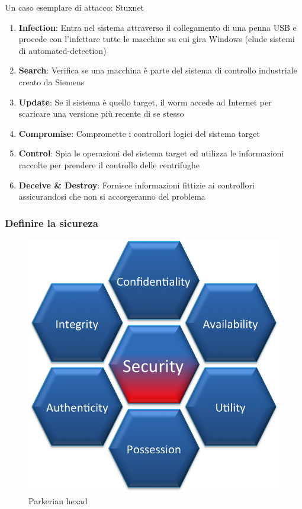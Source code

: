 \begin{frame}{Un caso esemplare di attacco: Stuxnet}
	\begin{enumerate}
		\item \textbf{\color{blue_slides}Infection}: Entra nel sistema attraverso il collegamento di una penna USB e procede con l’infettare tutte le macchine su cui gira Windows (elude sistemi di automated-detection) %
		\pause
		\item \textbf{\color{blue_slides}Search}: Verifica se una macchina è parte del sistema di controllo industriale creato da Siemens
		\pause
		\item \textbf{\color{blue_slides}Update}: Se il sistema è quello target, il worm accede ad Internet per scaricare una versione più recente di se stesso
		\pause
		\item \textbf{\color{blue_slides}Compromise}: Compromette i controllori logici del sistema target %
		\pause
		\item \textbf{\color{blue_slides}Control}: Spia le operazioni del sistema target ed utilizza le informazioni raccolte per prendere il controllo delle centrifughe %
		\pause
		\item \textbf{\color{blue_slides}Deceive \& Destroy}: Fornisce informazioni fittizie ai controllori assicurandosi che non si accorgeranno del problema
	\end{enumerate}
\end{frame}

\begin{frame}
  \frametitle{Definire la sicureza}
  	\begin{figure}[h] 
		\includegraphics[scale=0.4]{imgs/hexad.png}
		\caption{Parkerian hexad}
	\end{figure}
\end{frame}

